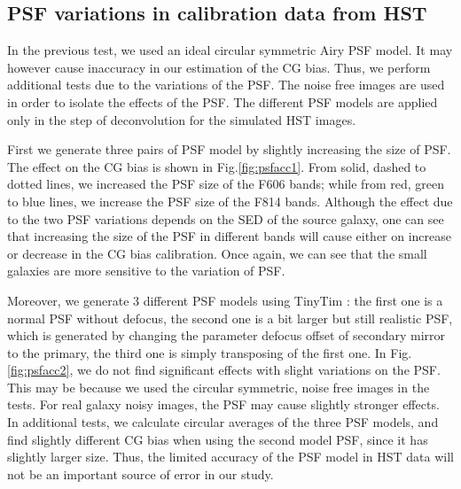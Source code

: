 \documentclass[useAMS,usenatbib]{mn2e}
\begin{document}
\subsection{PSF variations in calibration data from HST}

In the previous test, we used an ideal circular symmetric Airy PSF
model. It may however cause inaccuracy in our estimation of the CG
bias. Thus, we perform additional tests due to the variations of the
PSF. The noise free images are used in order to isolate the effects of
the PSF. The different PSF models are applied only in the step of
deconvolution for the simulated HST images.

First we generate three pairs of PSF model by slightly increasing the
size of PSF. The
effect on the CG bias is shown in Fig.\ref{fig:psfacc1}. From solid,
dashed to dotted lines, we increased the PSF size of the F606 bands; while
from red, green to blue lines, we increase the PSF size of the F814
bands. Although the effect due to the two PSF variations depends on the
SED of the source galaxy, one can see that increasing the size of the
PSF in different bands will cause either on increase or
decrease in the CG bias calibration. Once again, we can see that
the small galaxies are more sensitive to the variation of PSF.

Moreover, we generate 3 different PSF models using TinyTim
\citep{2011SPIE.8127E..0JK}: the first one is a normal PSF without
defocus, the second one is a bit larger but still realistic PSF, which
is generated by changing the parameter defocus offset of secondary
mirror to the primary, the third one is simply transposing of the
first one.  In Fig.\ref{fig:psfacc2}, we do not find significant
effects with slight variations on the PSF. This may be because we used
the circular symmetric, noise free images in the tests. For real
galaxy noisy images, the PSF may cause slightly stronger effects. In
additional tests, we calculate circular averages of the three PSF
models, and find slightly different CG bias when using the second
model PSF, since it has slightly larger size. Thus, the limited
accuracy of the PSF model in HST data
will not be an important source of error in our study.
\end{document}
